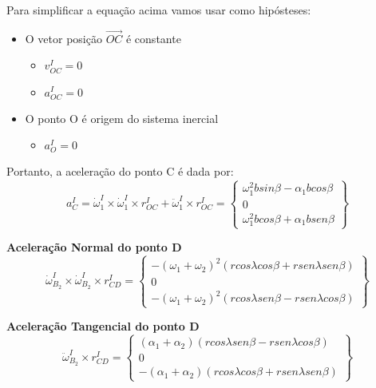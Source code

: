 \documentclass[a4paper, 12pt]{article}
\begin{document}
		Para simplificar a equação acima vamos usar como hipósteses:
		\begin{itemize}
			\item O vetor posição $\vec{OC}$ é constante
				\begin{itemize}
					\item $v^I_{OC} = 0$	
					\item $a^I_{OC} = 0$
				\end{itemize}
			\item O ponto O é origem do sistema inercial
				\begin{itemize}
					\item $a^I_{O} = 0$	
				\end{itemize}								
		\end{itemize}				
		Portanto, a aceleração do ponto C é dada por:
		\begin{equation}
			a^I_C = \dot{\omega}^I_1 \times \dot{\omega}^I_1 \times r^I_{OC} + \ddot{\omega}^I_1 \times r^I_{OC}= \begin{Bmatrix}
			\omega^2_1 bsin\beta -\alpha_1 bcos\beta\\
			0\\
			\omega^2_1 b cos \beta + \alpha_1 b sen \beta
			\end{Bmatrix} 
		\end{equation}
		
		\textbf{Aceleração Normal do ponto D}
			\begin{equation}
				\dot{\omega}^I_{B_2} \times \dot{\omega}^I_{B_2} \times r^I_{CD} = \begin{Bmatrix}
					-(\omega_1 + \omega_2)^2(rcos \lambda cos \beta + r sen \lambda sen \beta)\\
					0\\
					-(\omega_1 + \omega_2)^2(r cos \lambda sen \beta - r sen \lambda cos \beta)
				\end{Bmatrix}
			\end{equation}
			
		\textbf{Aceleração Tangencial do ponto D}
			\begin{equation}
				\ddot{\omega}^I_{B_2} \times r^I_{CD} = 
				\begin{Bmatrix}
					(\alpha_1 + \alpha_2)(r cos \lambda sen \beta - r sen \lambda cos \beta)\\
					0\\
					-(\alpha_1 + \alpha_2)(rcos \lambda cos \beta + r sen \lambda sen \beta)
				\end{Bmatrix}
			\end{equation}
		
		
		
		
		
		
		
		
		
		
		
		
		
		
		
		
		
		
		
		
		
		
		
\end{document}
